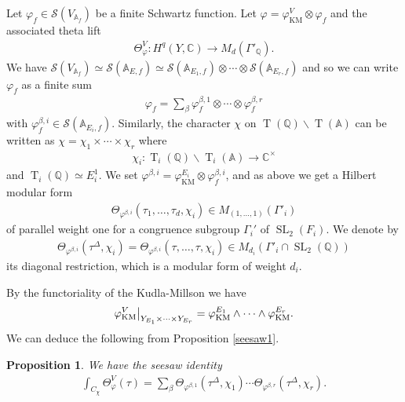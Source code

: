 \documentclass[11pt]{article} %
\newcommand{\8}{\infty}
\newcommand{\Tbf}{\operatorname{T}}
\newcommand{\SL}{\operatorname{SL}}
\newcommand{\KM}{\operatorname{KM}}
\newcommand{\A}{\mathbb{A}}
\newcommand{\Q}{\mathbb{Q}}
\newcommand{\C}{\mathbb{C}}
\newcommand{\Scal}{\mathcal{S}}
\newcommand{\fin}{f}
\newcommand\restr[2]{{%
  \left.\kern-\nulldelimiterspace %
  #1 %
  \vphantom{\big|} %
  \right|_{#2} %
  }}
\theoremstyle{mytheoremstyle}
\newtheorem{prop}[thm]{Proposition}
\theoremstyle{remark}
\numberwithin{equation}{section}
\begin{document}
Let $\varphi_\fin \in \Scal(V_{\A_\fin})$ be a finite Schwartz function. Let $\varphi=\varphi^V_{\KM} \otimes \varphi_\fin$ and the associated theta lift
\begin{align}
    \Theta^V_\varphi \colon H^{q}(Y,\C) \longrightarrow M_d(\Gamma'_\Q).
\end{align}
We have $\Scal(V_{\A_\fin}) \simeq \Scal(\A_{E,\fin}) \simeq \Scal(\A_{E_1,\fin})\otimes \cdots \otimes \Scal(\A_{E_r,\fin})$ and so we can write $\varphi_\fin$ as a finite sum
\begin{align}
    \varphi_\fin=\sum_{\beta} \varphi_\fin^{\beta,1} \otimes \cdots \otimes \varphi_\fin^{\beta,r}
\end{align}
with $\varphi_\fin^{\beta,i} \in \Scal(\A_{E_i,\fin})$. Similarly, the character $\chi$ on $\Tbf(\Q) \backslash \Tbf(\A)$ can be written as $\chi=\chi_1 \times \cdots \times \chi_r$ where
\begin{align}
    \chi_i \colon \Tbf_i(\Q) \backslash \Tbf_i(\A) \longrightarrow \C^\times
\end{align}
and $\Tbf_i(\Q) \simeq E_i^1$. We set $\varphi^{\beta,i} = \varphi_{\KM}^{E_i} \otimes \varphi_\fin^{\beta,i}$, and as above we get a Hilbert modular form
\begin{align}
    \Theta_{\varphi^{\beta,i}}(\tau_1,\dots, \tau_{d},\chi_i) \in M_{(1,\dots,1)}(\Gamma'_i)
\end{align}
of parallel weight one for a congruence subgroup $\Gamma_i'$ of $\SL_2(F_i)$. We denote by
\begin{align}
    \Theta_{\varphi^{\beta,i}}(\tau^\Delta,\chi_i)=\Theta_{\varphi^{\beta,i}}(\tau, \dots,\tau,\chi_i) \in M_{d_i}(\Gamma'_i \cap \SL_2(\Q))
\end{align} its diagonal restriction, which is a modular form of weight $d_i$.

By the functoriality of the Kudla-Millson we have
\begin{align}
    \restr{\varphi_{\KM}^V}{Y_{E_1} \times \cdots \times Y_{E_r}}=\varphi_{\KM}^{E_1} \wedge \cdots \wedge \varphi_{\KM}^{E_r}.
\end{align}
We can deduce the following from Proposition \ref{seesaw1}.
\begin{prop} \label{splitting}
    We have the seesaw identity
    \begin{align}
    \int_{C_\chi} \Theta^V_{\varphi}(\tau)=\sum_{\beta} \Theta_{\varphi^{\beta,1}}(\tau^\Delta,\chi_1) \cdots \Theta_{\varphi^{\beta,r}}(\tau^\Delta,\chi_r).
    \end{align}
\end{prop}
\end{document}
